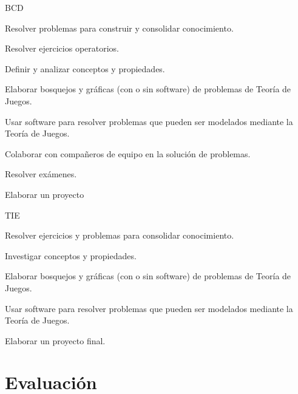 \documentclass[11pt]{article}
\newenvironment{tight_enumerate}{
	\begin{enumerate}
		\setlength{\itemsep}{0pt}
		\setlength{\parskip}{0pt}
	}{\end{enumerate}}
\begin{document}
\noindent\begin{mybox}[width=.49\textwidth, nobeforeafter, colback=gray!10]{BCD}
	
\begin{tight_enumerate}
	\item Resolver problemas para construir y consolidar conocimiento.
	\item Resolver ejercicios operatorios.
	\item Definir y analizar conceptos y propiedades.
	\item Elaborar bosquejos y gráficas (con o sin software) de problemas de Teoría de Juegos.
	\item Usar software para resolver problemas que pueden ser modelados mediante la Teoría de Juegos.
	\item Colaborar con compañeros de equipo en la solución de problemas.
	\item Resolver exámenes.
	\item Elaborar un proyecto
\end{tight_enumerate}
	

\end{mybox}\hfill
\noindent\begin{mybox}[width=.49\textwidth, nobeforeafter, colback=gray!10]{TIE}
\begin{tight_enumerate}
	\item Resolver ejercicios y problemas para consolidar conocimiento.
	\item Investigar conceptos y propiedades.
	\item Elaborar bosquejos y gráficas (con o sin software) de problemas de Teoría de Juegos.
	\item Usar software para resolver problemas que pueden ser modelados mediante la Teoría de Juegos.
	\item Elaborar un proyecto final.
	\vspace{5em}
\end{tight_enumerate}
\end{mybox}

\section{Evaluación}
\end{document}

